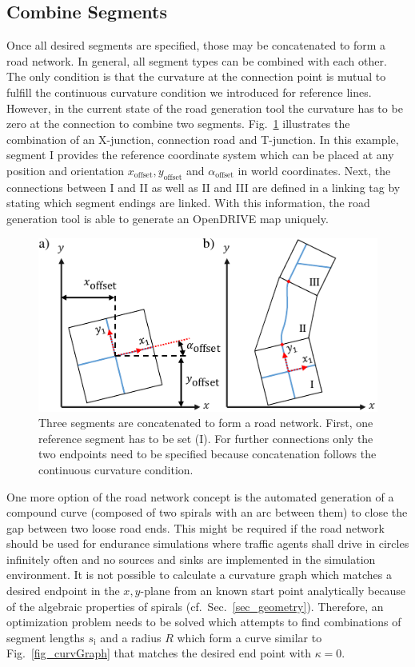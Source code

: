 \documentclass[a4paper, 10pt, conference]{ieeeconf}      %
\begin{document}
\subsection{Combine Segments}
Once all desired segments are specified, those may be concatenated to form a road network. In general, all segment types can be combined with each other. The only condition is that the curvature at the connection point is mutual to fulfill the continuous curvature condition we introduced for reference lines. However, in the current state of the road generation tool the curvature has to be zero at the connection to combine two segments. Fig.~\ref{fig_concatSeg} illustrates the combination of an X-junction, connection road and T-junction. In this example, segment I provides the reference coordinate system which can be placed at any position and orientation $x_\text{offset}, y_\text{offset}$ and $\alpha_\text{offset}$ in world coordinates. Next, the connections between I and II as well as II and III are defined in a linking tag by stating which segment endings are linked. With this information, the road generation tool is able to generate an OpenDRIVE map uniquely.
\begin{figure}[thpb] 		
	\centering
	\includegraphics{fig/concatSegments.pdf}
	\caption{Three segments are concatenated to form a road network. First, one reference segment has to be set (I). For further connections only the two endpoints need to be specified because concatenation follows the continuous curvature condition.}
	\label{fig_concatSeg}
\end{figure}

One more option of the road network concept is the automated generation of a compound curve (composed of two spirals with an arc between them) to close the gap between two loose road ends. This might be required if the road network should be used for endurance simulations where traffic agents shall drive in circles infinitely often and no sources and sinks are implemented in the simulation environment. It is not possible to calculate a curvature graph which matches a desired endpoint in the $x,y$-plane from an known start point analytically because of the algebraic properties of spirals (cf.~Sec.~\ref{sec_geometry}). Therefore, an optimization problem needs to be solved which attempts to find combinations of segment lengths $s_\text{i}$ and a radius $R$ which form a curve similar to Fig.~\ref{fig_curvGraph} that matches the desired end point with $\kappa=0$.
\end{document}
